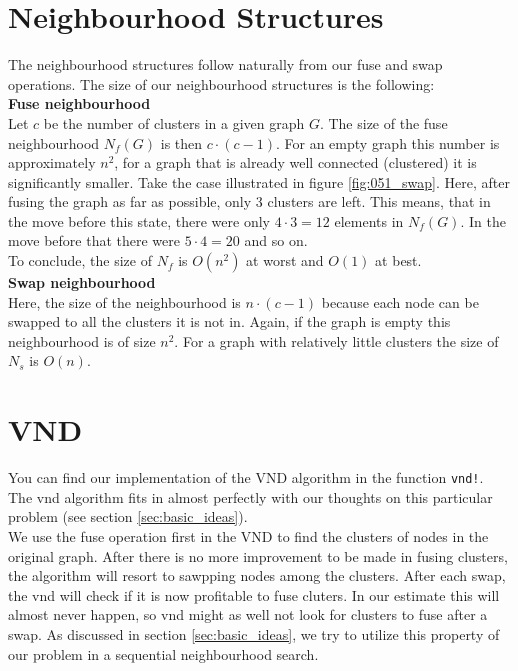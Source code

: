 \section{Neighbourhood Structures}
\label{sec:neigh}
The neighbourhood structures follow naturally from our fuse and swap operations. The size of our neighbourhood structures is the following:\\
\textbf{Fuse neighbourhood}\\
Let $c$ be the number of clusters in a given graph $G$. The size of the fuse neighbourhood $N_f(G)$ is then $c\cdot (c-1)$. For an empty graph this number is approximately $n^2$, for a graph that is already well connected (clustered) it is significantly smaller. Take the case illustrated in figure \ref{fig:051_swap}. Here, after fusing the graph as far as possible, only 3 clusters are left. This means, that in the move before this state, there were only $4\cdot 3=12$ elements in $N_f(G)$. In the move before that there were $5\cdot 4=20$ and so on.\\
To conclude, the size of $N_f$ is $O(n^2)$ at worst and $O(1)$ at best.\\
\textbf{Swap neighbourhood}\\
Here, the size of the neighbourhood is $n\cdot (c-1)$ because each node can be swapped to all the clusters it is not in. Again, if the graph is empty this neighbourhood is of size $n^2$. For a graph with relatively little clusters the size of $N_s$ is $O(n)$. 

\pagebreak

\section{VND}
You can find our implementation of the VND algorithm in the function \texttt{vnd!}. The vnd algorithm fits in almost perfectly with our thoughts on this particular problem (see section \ref{sec:basic_ideas}).\\
We use the fuse operation first in the VND to find the clusters of nodes in the original graph. After there is no more improvement to be made in fusing clusters, the algorithm will resort to sawpping nodes among the clusters. After each swap, the vnd will check if it is now profitable to fuse cluters. In our estimate this will almost never happen, so vnd might as well not look for clusters to fuse after a swap. As discussed in section \ref{sec:basic_ideas}, we try to utilize this property of our problem in a sequential neighbourhood search.

